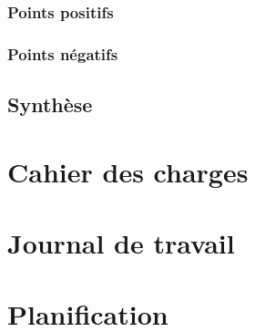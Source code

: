 \documentclass[11pt,a4paper,oldfontcommands]{memoir}
\begin{document}
\subsection{Points positifs}

\subsection{Points négatifs}

\section{Synthèse}


\lstlistoflistings


\appendix


\chapter{Cahier des charges}


\chapter{Journal de travail}


\chapter{Planification}
\end{document}
